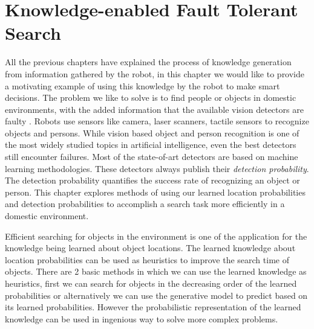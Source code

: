\chapter{Knowledge-enabled Fault Tolerant Search}
\label{cha: search}

All the previous chapters have explained the process of knowledge generation from information gathered by the robot, in this chapter we would like to provide a motivating example of using this knowledge by the robot to make smart decisions. The problem we like to solve is to find people or objects in domestic environments, with the added information that the available vision detectors are faulty \citep{Hoffman14Lsda, zhou2014recent}. Robots use sensors like camera, laser scanners, tactile sensors  to recognize objects and persons. While vision based object and person recognition is one of the most widely studied topics in artificial intelligence, even the best detectors still encounter failures. Most of the state-of-art detectors are based on machine learning methodologies. These detectors always publish their \emph{detection probability}. The detection probability quantifies the success rate of recognizing an object or person. This chapter explores methods of using our learned location probabilities and detection probabilities to accomplish a search task more efficiently in a domestic environment. 


Efficient searching for objects in the environment is one of the application for the knowledge being learned about object locations. The learned knowledge about location probabilities can be used as heuristics to improve the search time of objects. There are 2 basic methods in which we can use the learned knowledge as heuristics, first we can search for objects in the decreasing order of the learned probabilities or alternatively we can use the generative model to predict based on its learned probabilities. However the probabilistic representation of the learned knowledge can be used in ingenious way to solve more complex problems. 

